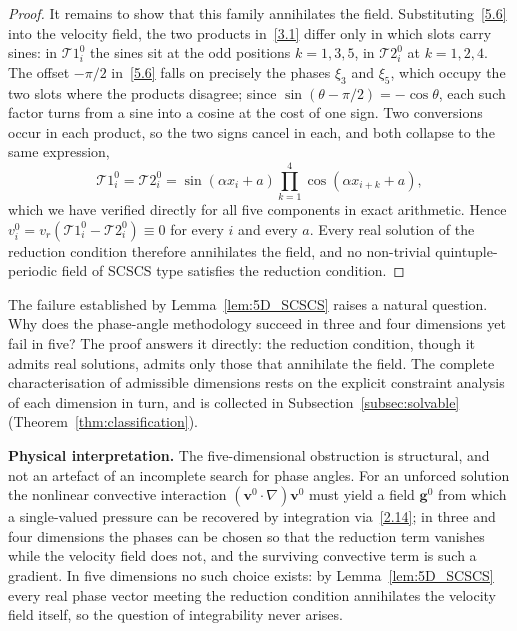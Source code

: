 \documentclass[11pt]{jfm}
\numberwithin{equation}{section}
\begin{document}
\begin{proof}
It remains to show that this family annihilates the field. Substituting~\eqref{5.6} into the velocity field, the two products in~\eqref{3.1} differ only in which slots carry sines: in $\mathcal{T}1_i^0$ the
sines sit at the odd positions $k=1,3,5$, in $\mathcal{T}2_i^0$ at $k=1,2,4$. The offset $-\pi/2$
in~\eqref{5.6} falls on precisely the phases $\xi_3$ and $\xi_5$, which occupy the two slots
where the products disagree; since $\sin(\theta-\pi/2)=-\cos\theta$, each such factor turns from
a sine into a cosine at the cost of one sign. Two conversions occur in each product, so the two
signs cancel in each, and both collapse to the same expression,
\begin{equation}
\label{5.7}
\mathcal{T}1_i^0 = \mathcal{T}2_i^0 = \sin(\alpha x_i + a)\prod_{k=1}^{4}\cos(\alpha x_{i+k} + a),
\end{equation}
which we have verified directly for all five components in exact arithmetic. Hence
$v_i^0=v_r(\mathcal{T}1_i^0-\mathcal{T}2_i^0)\equiv 0$ for every $i$ and every $a$. Every real solution of the reduction condition therefore annihilates the field, and no non-trivial quintuple-periodic field of SCSCS type satisfies the reduction condition.
\end{proof}
The failure established by Lemma~\ref{lem:5D_SCSCS} raises a natural question. Why does the
phase-angle methodology succeed in three and four dimensions yet fail in five? The proof answers it
directly: the reduction condition, though it admits real solutions, admits only those that
annihilate the field. The complete characterisation of admissible dimensions rests on the explicit
constraint analysis of each dimension in turn, and is collected in
Subsection~\ref{subsec:solvable} (Theorem~\ref{thm:classification}).

\textbf{Physical interpretation.} The five-dimensional obstruction is structural, and not an
artefact of an incomplete search for phase angles. For an unforced solution the nonlinear
convective interaction $(\boldsymbol{v}^0\cdot\nabla)\boldsymbol{v}^0$ must yield a field
$\boldsymbol{g}^0$ from which a single-valued pressure can be recovered by integration
via~\eqref{2.14}; in three and four dimensions the phases can be chosen so that the reduction term
vanishes while the velocity field does not, and the surviving convective term is such a gradient.
In five dimensions no such choice exists: by Lemma~\ref{lem:5D_SCSCS} every real phase vector
meeting the reduction condition annihilates the velocity field itself, so the question of
integrability never arises.
\end{document}
